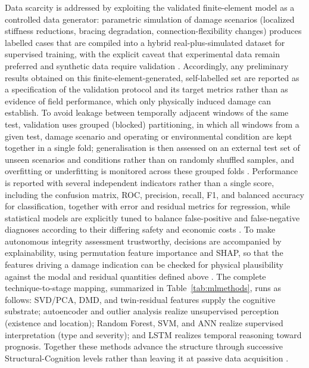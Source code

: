Data scarcity is addressed by exploiting the validated finite-element model as a controlled data generator: parametric simulation of damage scenarios (localized stiffness reductions, bracing degradation, connection-flexibility changes) produces labelled cases that are compiled into a hybrid real-plus-simulated dataset for supervised training, with the explicit caveat that experimental data remain preferred and synthetic data require validation \citep{naser2023ml,cook2002fea}. Accordingly, any preliminary results obtained on this finite-element-generated, self-labelled set are reported as a specification of the validation protocol and its target metrics rather than as evidence of field performance, which only physically induced damage can establish. To avoid leakage between temporally adjacent windows of the same test, validation uses grouped (blocked) partitioning, in which all windows from a given test, damage scenario and operating or environmental condition are kept together in a single fold; generalisation is then assessed on an external test set of unseen scenarios and conditions rather than on randomly shuffled samples, and overfitting or underfitting is monitored across these grouped folds \citep{naser2023ml}. Performance is reported with several independent indicators rather than a single score, including the confusion matrix, ROC, precision, recall, F1, and balanced accuracy for classification, together with error and residual metrics for regression, while statistical models are explicitly tuned to balance false-positive and false-negative diagnoses according to their differing safety and economic costs \citep{farrar2013shm,naser2023ml}. To make autonomous integrity assessment trustworthy, decisions are accompanied by explainability, using permutation feature importance and SHAP, so that the features driving a damage indication can be checked for physical plausibility against the modal and residual quantities defined above \citep{naser2023ml}. The complete technique-to-stage mapping, summarized in Table~\ref{tab:mlmethods}, runs as follows: SVD/PCA, DMD, and twin-residual features supply the cognitive substrate; autoencoder and outlier analysis realize unsupervised perception (existence and location); Random Forest, SVM, and ANN realize supervised interpretation (type and severity); and LSTM realizes temporal reasoning toward prognosis. Together these methods advance the structure through successive Structural-Cognition levels rather than leaving it at passive data acquisition \citep{farrar2013shm,brunton2019data,naser2023ml}.
